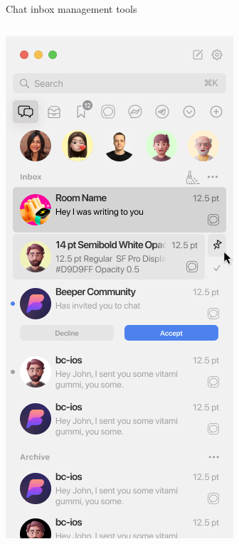 \documentclass{beeper}
\begin{document}
\begin{frame}{Chat inbox management tools}
    \begin{columns}
        \begin{column}{0.3\textwidth}
            \centerline{\includegraphics[width=\textwidth]{images/inbox-3.0}}

\end{column}
\end{columns}
\end{frame}
\end{document}

